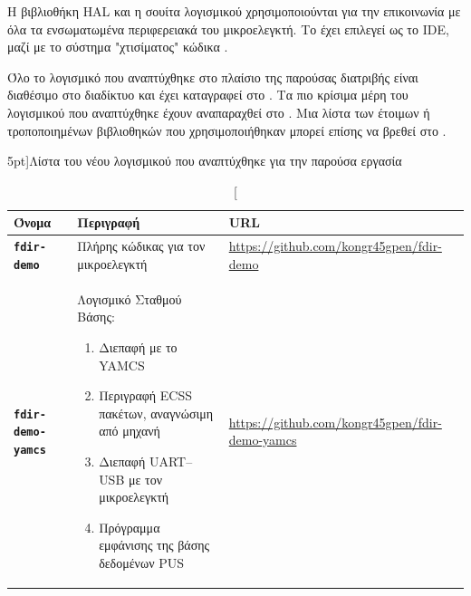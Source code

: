 \documentclass[a4paper,nobib]{tufte-book}
\begin{document}
Η βιβλιοθήκη \ac{HAL} και η σουίτα λογισμικού   χρησιμοποιούνται για την επικοινωνία με όλα τα ενσωματωμένα περιφερειακά του μικροελεγκτή. Το  έχει επιλεγεί ως το \acs{IDE}, μαζί με το σύστημα "χτισίματος" κώδικα .

Όλο το λογισμικό που αναπτύχθηκε στο πλαίσιο της παρούσας διατριβής είναι διαθέσιμο στο διαδίκτυο και έχει καταγραφεί στο . Τα πιο κρίσιμα μέρη του λογισμικού που αναπτύχθηκε έχουν αναπαραχθεί στο . Μια λίστα των έτοιμων ή τροποποιημένων βιβλιοθηκών που χρησιμοποιήθηκαν μπορεί επίσης να βρεθεί στο .


\begin{table}[h]
	\centering
	\caption[][5pt]{Λίστα του νέου λογισμικού που αναπτύχθηκε για την παρούσα εργασία}
	\label{tab:new_software}
	\begin{tabularx}{\textwidth}{@{}lXp{6cm}@{}}
		\toprule
		Όνομα & Περιγραφή & URL \\ \midrule
		\textbf{\texttt{fdir-demo}} & Πλήρης κώδικας για τον μικροελεγκτή  & \small \url{https://github.com/kongr45gpen/fdir-demo} \\
		\textbf{\texttt{fdir-demo-yamcs}} & Λογισμικό Σταθμού Βάσης: \begin{enumerate}
			\item Διεπαφή με το \acs{YAMCS}
			\item Περιγραφή \acs{ECSS} πακέτων, αναγνώσιμη από μηχανή
			\item Διεπαφή \acs{UART}--\acs{USB} με τον μικροελεγκτή
			\item Πρόγραμμα εμφάνισης της βάσης δεδομένων \acs{PUS}\vspace*{-2ex}
			\end{enumerate} & \small \url{https://github.com/kongr45gpen/fdir-demo-yamcs} \\
		\bottomrule
	\end{tabularx}
\end{table}
\end{document}
